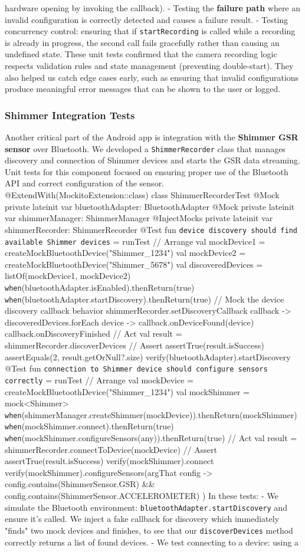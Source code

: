 hardware opening by invoking the callback). - Testing the \textbf{failure path} where an invalid configuration is correctly detected and causes a failure result. - Testing concurrency control: ensuring that if \texttt{startRecording} is called while a recording is already in progress, the second call fails gracefully rather than causing an undefined state. These unit tests confirmed that the camera recording logic respects validation rules and state management (preventing double-start). They also helped us catch edge cases early, such as ensuring that invalid configurations produce meaningful error messages that can be shown to the user or logged. \subsubsection{Shimmer Integration Tests} Another critical part of the Android app is integration with the \textbf{Shimmer GSR sensor} over Bluetooth. We developed a \texttt{ShimmerRecorder} class that manages discovery and connection of Shimmer devices and starts the GSR data streaming. Unit tests for this component focused on ensuring proper use of the Bluetooth API and correct configuration of the sensor. @ExtendWith(MockitoExtension::class) class ShimmerRecorderTest { @Mock private lateinit var bluetoothAdapter: BluetoothAdapter @Mock private lateinit var shimmerManager: ShimmerManager @InjectMocks private lateinit var shimmerRecorder: ShimmerRecorder @Test fun \texttt{device discovery should find available Shimmer devices} = runTest { // Arrange val mockDevice1 = createMockBluetoothDevice("Shimmer_1234") val mockDevice2 = createMockBluetoothDevice("Shimmer_5678") val discoveredDevices = listOf(mockDevice1, mockDevice2) \texttt{when}(bluetoothAdapter.isEnabled).thenReturn(true) \texttt{when}(bluetoothAdapter.startDiscovery).thenReturn(true) // Mock the device discovery callback behavior shimmerRecorder.setDiscoveryCallback { callback -> discoveredDevices.forEach { device -> callback.onDeviceFound(device) } callback.onDiscoveryFinished } // Act val result = shimmerRecorder.discoverDevices // Assert assertTrue(result.isSuccess) assertEquals(2, result.getOrNull?.size) verify(bluetoothAdapter).startDiscovery } @Test fun \texttt{connection to Shimmer device should configure sensors correctly} = runTest { // Arrange val mockDevice = createMockBluetoothDevice("Shimmer_1234") val mockShimmer = mock<Shimmer> \texttt{when}(shimmerManager.createShimmer(mockDevice)).thenReturn(mockShimmer) \texttt{when}(mockShimmer.connect).thenReturn(true) \texttt{when}(mockShimmer.configureSensors(any)).thenReturn(true) // Act val result = shimmerRecorder.connectToDevice(mockDevice) // Assert assertTrue(result.isSuccess) verify(mockShimmer).connect verify(mockShimmer).configureSensors(argThat { config -> config.contains(ShimmerSensor.GSR) && config.contains(ShimmerSensor.ACCELEROMETER) }) } } In these tests: - We simulate the Bluetooth environment: \texttt{bluetoothAdapter.startDiscovery} and ensure it's called. We inject a fake callback for discovery which immediately "finds" two mock devices and finishes, to see that our \texttt{discoverDevices} method correctly returns a list of found devices. - We test connecting to a device: using a 